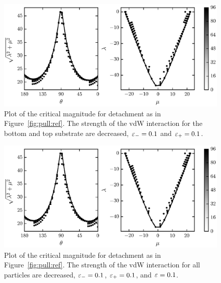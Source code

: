    \begin{figure}[t]
      \begin{center}
         \includegraphics{./fig/ch3/pull/eb0.1_et0.1/grid.eps}
      \end{center}      
      \caption{Plot of the critical magnitude for detachment as in Figure~\ref{fig:pull:ref}. The strength of the vdW interaction for the bottom and top substrate are decreased, $\varepsilon_-=0.1$ and $\varepsilon_+=0.1$.
      \label{fig:pull:eb0.1_et0.1}}
   \end{figure}
   
   \begin{figure}[t]
      \begin{center}
         \includegraphics{./fig/ch3/pull/eb0.1_et0.1_e0.1/grid.eps}
      \end{center}      
      \caption{Plot of the critical magnitude for detachment as in Figure~\ref{fig:pull:ref}. The strength of the vdW interaction for all particles are decreased, $\varepsilon_-=0.1$, $\varepsilon_+=0.1$, and $\varepsilon=0.1$.
      \label{fig:pull:eb0.1_et0.1_e0.1}}
   \end{figure}

